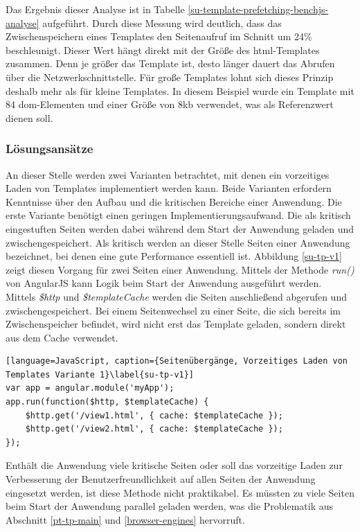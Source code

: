 Das Ergebnis dieser Analyse ist in Tabelle \ref{su-template-prefetching-benchjs-analyse} aufgeführt. Durch diese Messung wird deutlich, dass das Zwischenspeichern eines Templates den Seitenaufruf im Schnitt um 24\% beschleunigt. Dieser Wert hängt direkt mit der Größe des \gls{html}-Templates zusammen. Denn je größer das Template ist, desto länger dauert das Abrufen über die Netzwerkschnittstelle. Für große Templates lohnt sich dieses Prinzip deshalb mehr als für kleine Templates. In diesem Beispiel wurde ein Template mit 84 \gls{dom}-Elementen und einer Größe von 8kb verwendet, was als Referenzwert dienen soll. 

\subsubsection{Lösungsansätze}
An dieser Stelle werden zwei Varianten betrachtet, mit denen ein vorzeitiges Laden von Templates implementiert werden kann. Beide Varianten erfordern Kenntnisse über den Aufbau und die kritischen Bereiche einer Anwendung. Die erste Variante benötigt einen geringen Implementierungsaufwand. Die als kritisch eingestuften Seiten werden dabei während dem Start der Anwendung geladen und zwischengespeichert. Als kritisch werden an dieser Stelle Seiten einer Anwendung bezeichnet, bei denen eine gute Performance essentiell ist. Abbildung \ref{su-tp-v1} zeigt diesen Vorgang für zwei Seiten einer Anwendung. Mittels der Methode \emph{run()} von AngularJS kann Logik beim Start der Anwendung ausgeführt werden. Mittels \emph{\$http} und \emph{\$templateCache} werden die Seiten anschließend abgerufen und zwischengespeichert. Bei einem Seitenwechsel zu einer Seite, die sich bereits im Zwischenspeicher befindet, wird nicht erst das Template geladen, sondern direkt aus dem Cache verwendet.  
\begin{lstlisting}[language=JavaScript, caption={Seitenübergänge, Vorzeitiges Laden von Templates Variante 1}\label{su-tp-v1}]
var app = angular.module('myApp');
app.run(function($http, $templateCache) {
	$http.get('/view1.html', { cache: $templateCache });
	$http.get('/view2.html', { cache: $templateCache });
});
\end{lstlisting}
Enthält die Anwendung viele kritische Seiten oder soll das vorzeitige Laden zur Verbesserung der Benutzerfreundlichkeit auf allen Seiten der Anwendung eingesetzt werden, ist diese Methode nicht praktikabel. Es müssten zu viele Seiten beim Start der Anwendung parallel geladen werden, was die Problematik aus Abschnitt \ref{pt-tp-main} und \ref{browser-engines} hervorruft.  
